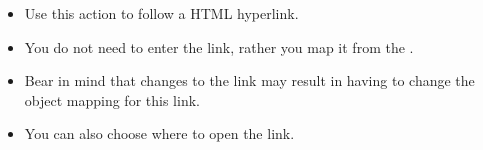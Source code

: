 
 
\begin{itemize}
\item Use this action to follow a HTML hyperlink. 
\item You do not need to enter the link, rather you map it from the \gdaut{}.
\item Bear in mind that changes to the link may result in having to change the object mapping for this link. 
\item You can also choose where to open the link.
\end{itemize}

